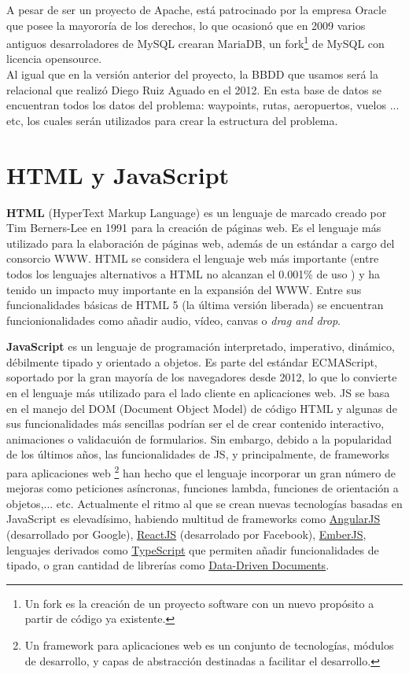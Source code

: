 A pesar de ser un proyecto de Apache, está patrocinado por la empresa Oracle que posee la mayororía de los derechos, lo que ocasionó que en 2009 varios antiguos desarroladores de MySQL crearan MariaDB, un fork\footnote{Un fork es la creación de un proyecto software con un nuevo propósito a partir de código ya existente.} de MySQL con licencia opensource.\\

Al igual que en la versión anterior del proyecto, la BBDD que usamos será la relacional que realizó Diego Ruiz Aguado en el 2012. En esta base de datos se encuentran todos los datos del problema: waypoints, rutas, aeropuertos, vuelos ... etc, los cuales serán utilizados para crear la estructura del problema.


\section{HTML y JavaScript}
\textbf{HTML} (HyperText Markup Language) es un lenguaje de marcado creado por Tim Berners-Lee en 1991 para la creación de páginas web. Es el lenguaje más utilizado para la elaboración de páginas web, además de un estándar a cargo del consorcio WWW.
HTML se considera el lenguaje web más importante (entre todos los lenguajes alternativos a HTML no alcanzan el 0.001\% de uso ) y ha tenido un impacto muy importante en la expansión del WWW. Entre sus funcionalidades básicas de HTML 5 (la última versión liberada) se encuentran funcionionalidades como añadir audio, vídeo, canvas o \textit{drag and drop}.

\textbf{JavaScript} es un lenguaje de programación interpretado, imperativo, dinámico, débilmente tipado y  orientado a objetos. Es parte del estándar ECMAScript, soportado por la gran mayoría de los navegadores desde 2012, lo que lo convierte en el lenguaje más utilizado para el lado cliente en aplicaciones web. 
JS se basa en el manejo del DOM (Document Object Model) de código HTML y algunas de sus funcionalidades más sencillas podrían ser el de crear contenido interactivo, animaciones o validacuión de formularios. Sin embargo, debido a la popularidad de los últimos años, las funcionalidades de JS, y principalmente, de frameworks para aplicaciones web \footnote{Un framework para aplicaciones web es un conjunto de tecnologías, módulos de desarrollo, y capas de abstracción destinadas a facilitar el desarrollo.} han hecho que el lenguaje incorporar un gran número de mejoras como peticiones asíncronas, funciones lambda, funciones de orientación a objetos,... etc.
Actualmente el ritmo al que se crean nuevas tecnologías basadas en JavaScript es elevadísimo, habiendo multitud de frameworks como \href{https://angularjs.org/}{AngularJS} (desarrollado por Google), \href{https://facebook.github.io/react/}{ReactJS} (desarrolado por Facebook), \href{https://www.emberjs.com/}{EmberJS}, lenguajes derivados como \href{https://www.typescriptlang.org/}{TypeScript} que permiten añadir funcionalidades de tipado, o gran cantidad de librerías como \href{https://d3js.org/}{Data-Driven Documents}.\\

